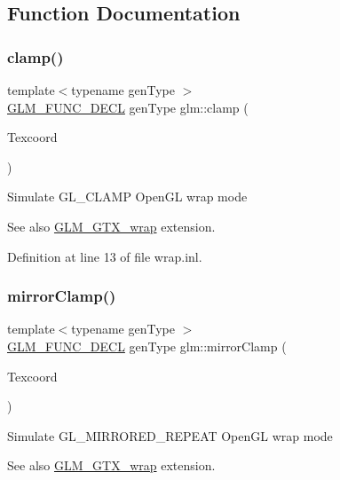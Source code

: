 \subsection{Function Documentation}
\mbox{\label{group__gtx__wrap_ga6c0cc6bd1d67ea1008d2592e998bad33}} 
\subsubsection{\texorpdfstring{clamp()}{clamp()}}
{\footnotesize\ttfamily template$<$typename gen\+Type $>$ \\
\mbox{\hyperlink{setup_8hpp_ab2d052de21a70539923e9bcbf6e83a51}{G\+L\+M\+\_\+\+F\+U\+N\+C\+\_\+\+D\+E\+CL}} gen\+Type glm\+::clamp (\begin{DoxyParamCaption}\item[{gen\+Type const \&}]{Texcoord }\end{DoxyParamCaption})}

Simulate G\+L\+\_\+\+C\+L\+A\+MP Open\+GL wrap mode \begin{DoxySeeAlso}{See also}
\mbox{\hyperlink{group__gtx__wrap}{G\+L\+M\+\_\+\+G\+T\+X\+\_\+wrap}} extension. 
\end{DoxySeeAlso}


Definition at line 13 of file wrap.\+inl.

\mbox{\label{group__gtx__wrap_gaa6856a0a048d2749252848da35e10c8b}} 
\subsubsection{\texorpdfstring{mirrorClamp()}{mirrorClamp()}}
{\footnotesize\ttfamily template$<$typename gen\+Type $>$ \\
\mbox{\hyperlink{setup_8hpp_ab2d052de21a70539923e9bcbf6e83a51}{G\+L\+M\+\_\+\+F\+U\+N\+C\+\_\+\+D\+E\+CL}} gen\+Type glm\+::mirror\+Clamp (\begin{DoxyParamCaption}\item[{gen\+Type const \&}]{Texcoord }\end{DoxyParamCaption})}

Simulate G\+L\+\_\+\+M\+I\+R\+R\+O\+R\+E\+D\+\_\+\+R\+E\+P\+E\+AT Open\+GL wrap mode \begin{DoxySeeAlso}{See also}
\mbox{\hyperlink{group__gtx__wrap}{G\+L\+M\+\_\+\+G\+T\+X\+\_\+wrap}} extension. 
\end{DoxySeeAlso}


